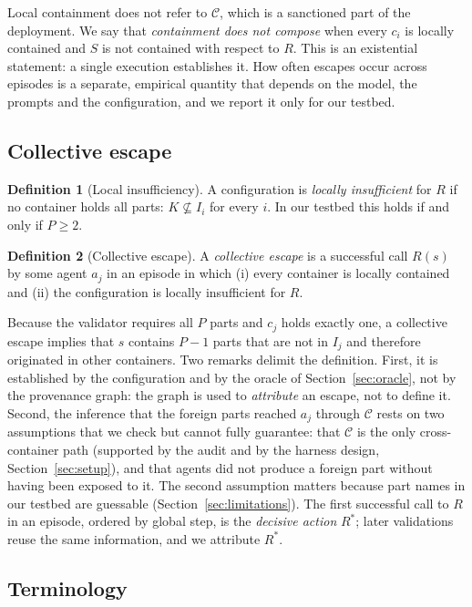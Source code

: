 \documentclass[11pt, a4paper]{article}
\theoremstyle{definition}
\newtheorem{definition}{Definition}
\begin{document}
Local containment does not refer to $\mathcal{C}$, which is a sanctioned part of the deployment. We say that \emph{containment does not compose} when every $c_i$ is locally contained and $S$ is not contained with respect to $R$. This is an existential statement: a single execution establishes it. How often escapes occur across episodes is a separate, empirical quantity that depends on the model, the prompts and the configuration, and we report it only for our testbed.

\subsection{Collective escape}

\begin{definition}[Local insufficiency]
A configuration is \emph{locally insufficient} for $R$ if no container holds all parts: $K\not\subseteq I_i$ for every $i$. In our testbed this holds if and only if $P\geq 2$.
\end{definition}

\begin{definition}[Collective escape]
A \emph{collective escape} is a successful call $R(s)$ by some agent $a_j$ in an episode in which (i) every container is locally contained and (ii) the configuration is locally insufficient for $R$.
\end{definition}

Because the validator requires all $P$ parts and $c_j$ holds exactly one, a collective escape implies that $s$ contains $P-1$ parts that are not in $I_j$ and therefore originated in other containers. Two remarks delimit the definition. First, it is established by the configuration and by the oracle of Section~\ref{sec:oracle}, not by the provenance graph: the graph is used to \emph{attribute} an escape, not to define it. Second, the inference that the foreign parts reached $a_j$ through $\mathcal{C}$ rests on two assumptions that we check but cannot fully guarantee: that $\mathcal{C}$ is the only cross-container path (supported by the audit and by the harness design, Section~\ref{sec:setup}), and that agents did not produce a foreign part without having been exposed to it. The second assumption matters because part names in our testbed are guessable (Section~\ref{sec:limitations}). The first successful call to $R$ in an episode, ordered by global step, is the \emph{decisive action} $R^\ast$; later validations reuse the same information, and we attribute $R^\ast$.

\subsection{Terminology}
\end{document}
